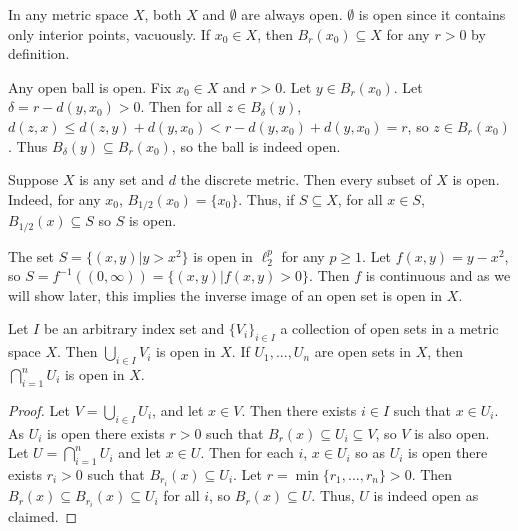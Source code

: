 \begin{example}
    In any metric space $X$, both $X$ and $\emptyset$ are always open. $\emptyset$ is open since it contains only interior points, vacuously. If $x_0 \in X$, then $B_r(x_0) \subseteq X$ for any $r > 0$ by definition.
\end{example}

\begin{example}
    Any open ball is open. Fix $x_0 \in X$ and $r > 0$. Let $y \in B_r(x_0)$. Let $\delta = r - d(y,x_0) > 0$. Then for all $z \in B_{\delta}(y)$, $d(z,x) \leq d(z,y) + d(y,x_0) < r-d(y,x_0) + d(y,x_0) = r$, so $z \in B_r(x_0)$. Thus $B_{\delta}(y) \subseteq B_r(x_0)$, so the ball is indeed open.
\end{example}

\begin{example}
    Suppose $X$ is any set and $d$ the discrete metric. Then every subset of $X$ is open. Indeed, for any $x_0$, $B_{1/2}(x_0) = \{x_0\}$. Thus, if $S \subseteq X$, for all $x \in S$, $B_{1/2}(x) \subseteq S$ so $S$ is open.
\end{example}

\begin{example}
    The set $S = \{(x,y)\vert y > x^2\}$ is open in $\ell_2^p$ for any $p \geq 1$. Let $f(x,y) = y-x^2$, so $S = f^{-1}((0,\infty)) = \{(x,y)\vert f(x,y) > 0\}$. Then $f$ is continuous and as we will show later, this implies the inverse image of an open set is open in $X$.
\end{example}

\begin{proposition}
    Let $I$ be an arbitrary index set and $\{V_i\}_{i \in I}$ a collection of open sets in a metric space $X$. Then $\bigcup_{i \in I}V_i$ is open in $X$. If $U_1,...,U_n$ are open sets in $X$, then $\bigcap_{i=1}^nU_i$ is open in $X$.
\end{proposition}
\begin{proof}
    Let $V = \bigcup_{i\in I}U_i$, and let $x \in V$. Then there exists $i \in I$ such that $x \in U_i$. As $U_i$ is open there exists $r > 0$ such that $B_r(x) \subseteq U_i \subseteq V$, so $V$ is also open. Let $U = \bigcap_{i=1}^nU_i$ and let $x \in U$. Then for each $i$, $x \in U_i$ so as $U_i$ is open there exists $r_i > 0$ such that $B_{r_i}(x) \subseteq U_i$. Let $r = \min\{r_1,...,r_n\} > 0$. Then $B_r(x) \subseteq B_{r_i}(x) \subseteq U_i$ for all $i$, so $B_r(x) \subseteq U$. Thus, $U$ is indeed open as claimed.
\end{proof}

